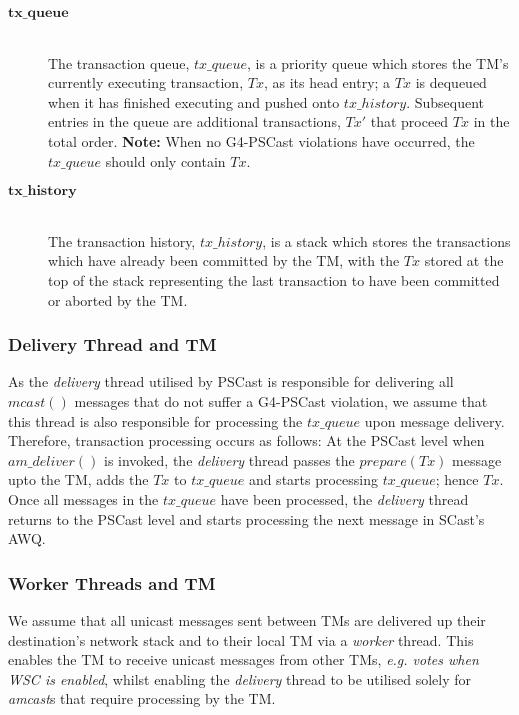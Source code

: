 \begin{description}
        \item[$\bm{tx\_queue}$] \hfill \\
        The transaction queue, $tx\_queue$, is a priority queue which stores the TM's currently executing transaction, $Tx$, as its head entry; a $Tx$ is dequeued when it has finished executing and pushed onto $tx\_history$.  Subsequent entries in the queue are additional transactions, $Tx'$ that proceed $Tx$ in the total order.  \textbf{Note:} When no G4-PSCast violations have occurred, the $tx\_queue$ should only contain $Tx$.  
        
        \item[$\bm{tx\_history}$] \hfill \\
        The transaction history, $tx\_history$, is a stack which stores the transactions which have already been committed by the TM, with the $Tx$ stored at the top of the stack representing the last transaction to have been committed or aborted by the TM.  
    \end{description}
    
    \subsubsection*{Delivery Thread and TM}
    As the \emph{delivery} thread utilised by \textsf{PSCast} is responsible for delivering all $mcast()$ messages that do not suffer a G4-PSCast violation, we assume that this thread is also responsible for processing the $tx\_queue$ upon message delivery.  Therefore, transaction processing occurs as follows: At the \textsf{PSCast} level when $am\_deliver()$ is invoked, the \emph{delivery} thread passes the $prepare(Tx)$ message upto the TM, adds the $Tx$ to $tx\_queue$ and starts processing $tx\_queue$; hence $Tx$.  Once all messages in the $tx\_queue$ have been processed, the \emph{delivery} thread returns to the \textsf{PSCast} level and starts processing the next message in \textsf{SCast}'s AWQ.
    
    \subsubsection*{Worker Threads and TM}
    We assume that all unicast messages sent between TMs are delivered up their destination's network stack and to their local TM via a \emph{worker} thread.  This enables the TM to receive unicast messages from other TMs, \emph{e.g. votes when WSC is enabled}, whilst enabling the \emph{delivery} thread to be utilised solely for \emph{amcast}s that require processing by the TM.  
       
